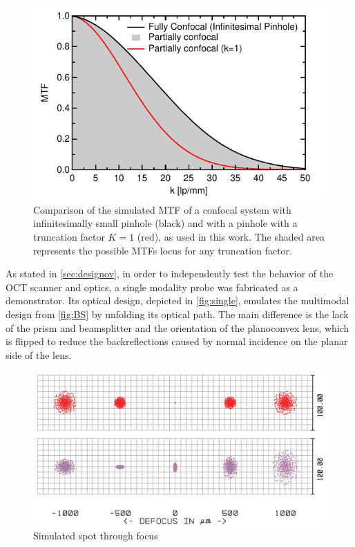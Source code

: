 \documentclass[10pt]{iopart}
\begin{document}
\begin{figure}[h!]\centering \includegraphics[width=\columnwidth]{figures/fullPartialConfocal.pdf}
      \caption{	Comparison of the simulated MTF of a confocal system with infinitesimally small pinhole (black) and with a pinhole with a truncation factor $K=1$ (red), as used in this work. The shaded area represents the possible MTFs locus for any truncation factor.}
      \label{fig:fullPartialConfocal}
\end{figure}

As stated in \autoref{sec:designov}, in order to independently test the behavior of the OCT scanner and optics, a single modality probe was fabricated as a demonstrator. Its optical design, depicted in \autoref{fig:single}, emulates the multimodal design from \autoref{fig:BS} by unfolding its optical path. The main difference is the lack of the prism and beamsplitter and the orientation of the planoconvex lens, which is flipped to reduce the backreflections caused by normal incidence on the planar side of the lens.


\begin{figure}[h!]\centering
      \includegraphics[width=\columnwidth]{figures/singleSpot.png}
      \caption{Simulated spot through focus}
      \label{fig:MTFcomp}
\end{figure}
\end{document}
